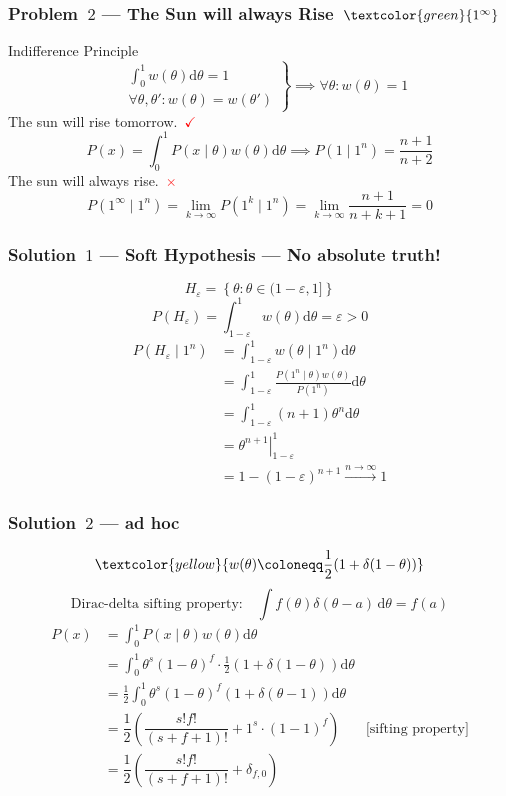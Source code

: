 \documentclass[UTF8,11pt,colorlinks,compress,openany]{beamer}%
\begin{document}
\begin{frame}\frametitle{Problem~$2$ --- The Sun will always Rise~$\textcolor{green}{1^\infty}$}
	\noindent Indifference Principle
	\[\left.
	\begin{aligned}
	&\int_0^1\!\! w(\theta)\mathrm{d}\theta=1\\
	&\forall\theta,\theta': w(\theta)=w(\theta')
	\end{aligned}
	\right\rbrace\implies\forall\theta: w(\theta)=1
	\]
	The sun will rise tomorrow.~\textcolor{red}{$\checkmark$}
	\[
	P(x)=\int_0^1\!\! P(x\mid \theta)w(\theta)\mathrm{d}\theta \implies P(1\mid 1^n)=\dfrac{n+1}{n+2}
	\]
	The sun will always rise.~\textcolor{red}{$\times$}
	\[P(1^{\infty}\mid 1^n)=\lim\limits_{k\to\infty}P(1^k\mid 1^n)=\lim\limits_{k\to\infty}\dfrac{n+1}{n+k+1}=0\]
\end{frame}

\begin{frame}\frametitle{Solution~$1$ --- Soft Hypothesis --- No absolute truth!}
	\vspace{-1em}
	\[H_\varepsilon=\left\{\theta:\theta\in(1-\varepsilon,1]\right\}\]
	\[P(H_\varepsilon)=\int_{1-\varepsilon}^1\!\! w(\theta)\mathrm{d}\theta=\varepsilon>0\]
	\begin{align*}
	P(H_\varepsilon\mid 1^n)&=\int_{1-\varepsilon}^1\!\! w(\theta\mid 1^n)\mathrm{d}\theta\\
	&=\int_{1-\varepsilon}^1\!\! \frac{P(1^n\mid \theta) w(\theta)}{P(1^n)}\mathrm{d}\theta\\
	&=\int_{1-\varepsilon}^1\!\! (n+1)\theta^n \mathrm{d}\theta\\
	&=\left.\theta^{n+1}\right|_{1-\varepsilon}^1\\
	&=1-(1-\varepsilon)^{n+1}\xrightarrow{n\to\infty} 1
	\end{align*}
\end{frame}

\begin{frame}\frametitle{Solution~$2$ --- ad hoc}
	\[\textcolor{yellow}{w(\theta)\coloneqq \dfrac{1}{2}(1+\delta(1-\theta))}\]
	\[\text{Dirac-delta sifting property:}\quad\int\!\! f(\theta)\delta(\theta-a)\,\mathrm{d}\theta=f(a)\]
	\begin{align*}
	P(x)&=\int_0^1\!\! P(x\mid\theta)w(\theta)\mathrm{d}\theta\\
	&=\int_0^1\!\! \theta^s(1-\theta)^f\cdot \frac{1}{2}(1+\delta(1-\theta))\mathrm{d}\theta\\
	&=\frac{1}{2}\int_0^1\!\! \theta^s(1-\theta)^f (1+\delta(\theta-1))\mathrm{d}\theta\\
	&=\dfrac{1}{2}\left(\dfrac{s!f!}{(s+f+1)!}+1^s\cdot (1-1)^f\right) &\text{[sifting property]}\\
	&=\dfrac{1}{2}\left(\dfrac{s!f!}{(s+f+1)!}+\delta_{f,0}\right)
	\end{align*}
\end{frame}
\end{document}
